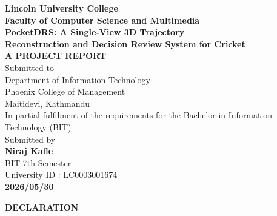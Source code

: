 \documentclass[12pt,a4paper]{report}
\begin{document}
\hypersetup{pageanchor=false}

\begin{titlepage}
\begin{center}
\vspace*{0.4cm}

\textbf{\fontsize{18}{22}\selectfont Lincoln University College}\\[28pt]

\textbf{\fontsize{15}{18}\selectfont Faculty of Computer Science and Multimedia}\\[34pt]

\textbf{\fontsize{17}{21}\selectfont PocketDRS: A Single-View 3D Trajectory\\
Reconstruction and Decision Review System for Cricket}\\[16pt]

\textbf{\fontsize{15}{18}\selectfont A PROJECT REPORT}\\[24pt]

\fontsize{13}{16}\selectfont
Submitted to\\[22pt]
Department of Information Technology\\[22pt]
Phoenix College of Management\\[22pt]
Maitidevi, Kathmandu\\[26pt]

In partial fulfilment of the requirements for the Bachelor in Information\\
Technology (BIT)\\[26pt]

Submitted by\\[22pt]
\textbf{Niraj Kafle}\\[6pt]
BIT 7th Semester\\[6pt]
University ID : LC0003001674\\[24pt]

\textbf{2026/05/30}

\end{center}
\end{titlepage}


\begin{center}\textbf{\fontsize{16}{19}\selectfont DECLARATION}\end{center}
\vspace{0.5cm}
\end{document}
